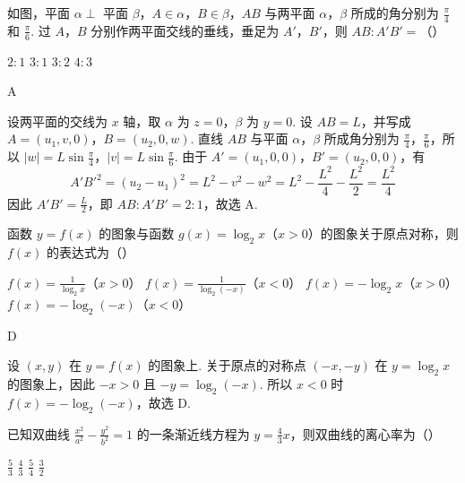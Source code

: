 \begin{problem}
如图，平面 \(\alpha \perp\) 平面 \(\beta\)，\(A \in \alpha\)，\(B \in \beta\)，\(AB\) 与两平面 \(\alpha\)，\(\beta\) 所成的角分别为 \(\frac{\pi}{4}\) 和 \(\frac{\pi}{6}\). 过 \(A\)，\(B\) 分别作两平面交线的垂线，垂足为 \(A'\)，\(B'\)，则 \(AB:A'B'=\)（\quad）


\choices
    {\(2:1\)}
    {\(3:1\)}
    {\(3:2\)}
    {\(4:3\)}
\end{problem}

\begin{answer}
A
\end{answer}

\begin{solution}
设两平面的交线为 \(x\) 轴，取 \(\alpha\) 为 \(z=0\)，\(\beta\) 为 \(y=0\). 设 \(AB=L\)，并写成
\(A=(u_1,v,0)\)，\(B=(u_2,0,w)\). 直线 \(AB\) 与平面 \(\alpha\)，\(\beta\) 所成角分别为 \(\frac\pi4\)，\(\frac\pi6\)，所以
\(\lvert w\rvert=L\sin\frac\pi4\)，\(\lvert v\rvert=L\sin\frac\pi6\). 由于 \(A'=(u_1,0,0)\)，\(B'=(u_2,0,0)\)，有
\[
 A'B'^2=(u_2-u_1)^2=L^2-v^2-w^2=L^2-\frac{L^2}{4}-\frac{L^2}{2}=\frac{L^2}{4}
\]
因此 \(A'B'=\frac L2\)，即 \(AB:A'B'=2:1\)，故选 A.
\end{solution}

\begin{problem}
函数 \(y = f(x)\) 的图象与函数 \(g(x) = \log_2 x\)（\(x > 0\)）的图象关于原点对称，则 \(f(x)\) 的表达式为（\quad）

\choices
    {\(f(x) = \frac{1}{\log_2 x}\)（\(x > 0\)）}
    {\(f(x) = \frac{1}{\log_2(-x)}\)（\(x < 0\)）}
    {\(f(x) = -\log_2 x\)（\(x > 0\)）}
    {\(f(x) = -\log_2(-x)\)（\(x < 0\)）}
\end{problem}

\begin{answer}
D
\end{answer}

\begin{solution}
设 \((x,y)\) 在 \(y=f(x)\) 的图象上. 关于原点的对称点 \((-x,-y)\) 在 \(y=\log_2x\) 的图象上，因此 \(-x>0\) 且
\(-y=\log_2(-x)\). 所以 \(x<0\) 时 \(f(x)=-\log_2(-x)\)，故选 D.
\end{solution}

\begin{problem}
已知双曲线 \(\frac{x^2}{a^2} - \frac{y^2}{b^2} = 1\) 的一条渐近线方程为 \(y = \frac{4}{3} x\)，则双曲线的离心率为（\quad）

\choices
    {\(\frac{5}{3}\)}
    {\(\frac{4}{3}\)}
    {\(\frac{5}{4}\)}
    {\(\frac{3}{2}\)}
\end{problem}

